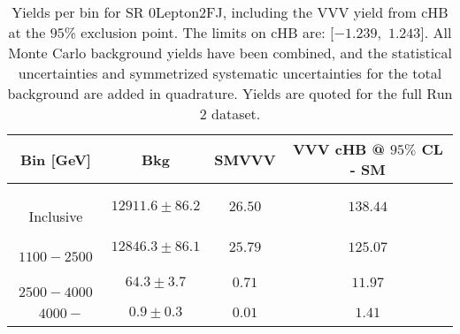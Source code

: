 \begin{table}[!htbp]
    \small
    \center
    \begin{tabular}{c||c|c|c}
    Bin [GeV] & Bkg & SMVVV & \pbox{20cm}{VVV \\ cHB @ $95\%$ CL - SM \\ }\\
    \hline
    \pbox{20cm}{ ~ \\Inclusive\\ } & $12911.6 \pm 86.2$ & $26.50$ & $138.44$\\
    \hline
    \pbox{20cm}{ ~ \\$1100-2500$\\ } & $12846.3 \pm 86.1$ & $25.79$ & $125.07$\\
    \hline
    \pbox{20cm}{ ~ \\$2500-4000$\\ } & $64.3 \pm 3.7$ & $0.71$ & $11.97$\\
    \hline
    \pbox{20cm}{ ~ \\$4000-$\\ } & $0.9 \pm 0.3$ & $0.01$ & $1.41$\\
\end{tabular}
    \caption{Yields per bin for SR 0Lepton2FJ, including the VVV yield from cHB at the $95$\% exclusion point. The limits on cHB are: [$-1.239$,~$1.243$]. All Monte Carlo background yields have been combined, and the statistical uncertainties and symmetrized systematic uncertainties for the total background are added in quadrature. Yields are quoted for the full Run 2 dataset.}
    \label{tab:0Lepton2FJ$binssignal}
\end{table}
